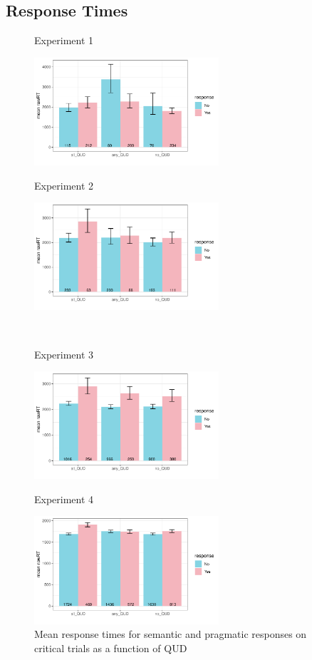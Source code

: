 \documentclass[12pt]{article}
\begin{document}
\pagebreak
\subsection*{Response Times}

\begin{figure}[!h] 
    \centering
    \begin{minipage}{.5\textwidth}
        \caption*{Experiment 1}
        \includegraphics[height=4cm]{img/exp1_response_time.pdf}
    \end{minipage}%
    \begin{minipage}{.5\textwidth}
        \caption*{Experiment 2}
        \includegraphics[height=4cm]{img/exp2_response_time.pdf}
    \end{minipage}%
    \\
    \begin{minipage}{.5\textwidth}
        \caption*{Experiment 3}
        \includegraphics[height=4cm]{img/exp3_response_time.pdf}
    \end{minipage}%
    \begin{minipage}{.5\textwidth}
        \caption*{Experiment 4}
        \includegraphics[height=4cm]{img/exp4_response_time.pdf}
    \end{minipage}%
    \caption{Mean response times for semantic and pragmatic responses on critical trials as a function of QUD}
\end{figure}
\end{document}
